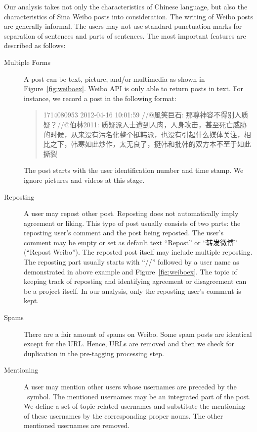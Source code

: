 \documentclass[11pt]{article}
\newcommand{\1}[1]{{\mathbf 1}\left\{#1\right\}}        %
\begin{document}
Our analysis takes not only the characteristics of Chinese language, but also the characteristics of Sina Weibo posts into consideration.
The writing of Weibo posts are generally informal. The users may not use standard punctuation marks for separation of sentences and parts of sentences. The most important features are described as follows:
\begin{description}
\item[Multiple Forms] A post can be text, picture, and/or multimedia as shown in Figure~\ref{fig:weiboex}. Weibo API is only able to return posts in text. For instance, we record a post in the following format:
\begin{quote}
1714080953 2012-04-16 10:01:59 //@風笑巨石: 那尊神容不得别人质疑？//@伯林2011: 
质疑派人士遭到人肉，人身攻击，甚至死亡威胁的时候，从来没有污名化整个挺韩派，也没有引起什么媒体关注，相比之下，韩寒如此炒作，太无良了，挺韩和批韩的双方本不至于如此撕裂
\end{quote}
The post starts with the user identification number and time stamp. We ignore pictures and videos at this stage. 

\item[Reposting] A user may repost other post. Reposting does not automatically imply agreement or liking. This type of post usually consists of two parts: the reposting user's comment and the post being reposted. The user's comment may be empty or set as default text ``Repost'' or ``转发微博'' (``Repost Weibo''). The reposted post itself may include multiple reposting. The reposting part usually starts with  ``//\MVAt'' followed by a user name as demonstrated in above example and Figure~\ref{fig:weiboex}. The topic of keeping track of reposting and identifying agreement or disagreement can be a project itself. In our analysis, only the reposting user's comment is kept.  

\item[Spams] There are a fair amount of spams on Weibo. Some spam posts are identical except for the URL. Hence, URLs are removed and then we check for duplication in the pre-tagging processing step.

\item[Mentioning] A user may mention other users whose usernames are preceded by the \MVAt\  symbol. The mentioned usernames may be an integrated part of the post. We define a set of topic-related usernames and substitute the mentioning of these usernames by the corresponding proper nouns. The other mentioned usernames are removed.


\end{description}
\end{document}
